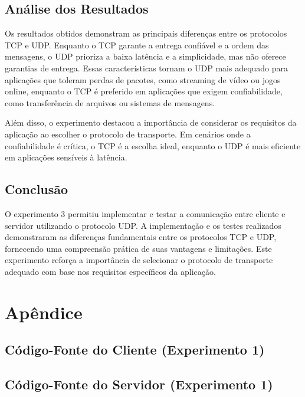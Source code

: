 \documentclass{article}
\begin{document}
\subsection{Análise dos Resultados}

Os resultados obtidos demonstram as principais diferenças entre os protocolos TCP e UDP. Enquanto o TCP garante a entrega confiável e a ordem das mensagens, o UDP prioriza a baixa latência e a simplicidade, mas não oferece garantias de entrega. Essas características tornam o UDP mais adequado para aplicações que toleram perdas de pacotes, como streaming de vídeo ou jogos online, enquanto o TCP é preferido em aplicações que exigem confiabilidade, como transferência de arquivos ou sistemas de mensagens.

Além disso, o experimento destacou a importância de considerar os requisitos da aplicação ao escolher o protocolo de transporte. Em cenários onde a confiabilidade é crítica, o TCP é a escolha ideal, enquanto o UDP é mais eficiente em aplicações sensíveis à latência.

\subsection{Conclusão}

O experimento 3 permitiu implementar e testar a comunicação entre cliente e servidor utilizando o protocolo UDP. A implementação e os testes realizados demonstraram as diferenças fundamentais entre os protocolos TCP e UDP, fornecendo uma compreensão prática de suas vantagens e limitações. Este experimento reforça a importância de selecionar o protocolo de transporte adequado com base nos requisitos específicos da aplicação.

\section{Apêndice}

\subsection{Código-Fonte do Cliente (Experimento 1)}



\subsection{Código-Fonte do Servidor (Experimento 1)}
\end{document}
